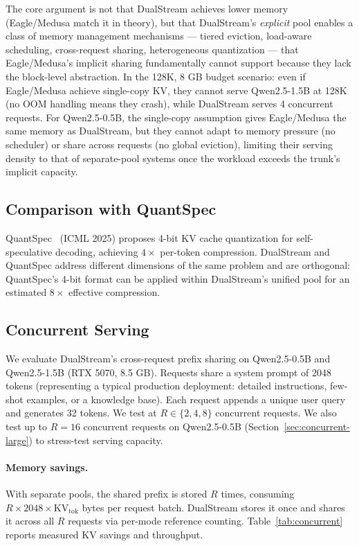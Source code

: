 \documentclass[review]{elsarticle}
\theoremstyle{definition}
\theoremstyle{remark}
\begin{document}
The core argument is not that DualStream achieves lower memory
(Eagle/Medusa match it in theory), but that DualStream's \emph{explicit}
pool enables a class of memory management mechanisms --- tiered eviction,
load-aware scheduling, cross-request sharing, heterogeneous
quantization --- that Eagle/Medusa's implicit sharing fundamentally
cannot support because they lack the block-level abstraction.
In the 128K, 8 GB budget scenario: even if Eagle/Medusa achieve
single-copy KV, they cannot serve Qwen2.5-1.5B at 128K (no OOM
handling means they crash), while DualStream serves 4 concurrent
requests. For Qwen2.5-0.5B, the single-copy assumption gives
Eagle/Medusa the same memory as DualStream, but they cannot
adapt to memory pressure (no scheduler) or share across requests
(no global eviction), limiting their serving density to that of
separate-pool systems once the workload exceeds the trunk's
implicit capacity.

\subsection{Comparison with QuantSpec}
\label{sec:eval-quantspec}

QuantSpec~\cite{quantspec2025} (ICML 2025) proposes 4-bit KV cache
quantization for self-speculative decoding, achieving $4\times$ per-token
compression. DualStream and QuantSpec address different dimensions of
the same problem and are orthogonal: QuantSpec's 4-bit format can be
applied within DualStream's unified pool for an estimated $8\times$
effective compression.

\subsection{Concurrent Serving}
\label{sec:concurrent-serving}

We evaluate DualStream's cross-request prefix sharing on Qwen2.5-0.5B
and Qwen2.5-1.5B (RTX 5070, 8.5 GB). Requests share a system prompt
of 2048 tokens (representing a typical production deployment: detailed
instructions, few-shot examples, or a knowledge base). Each request
appends a unique user query and generates 32 tokens. We test at
$R \in \{2, 4, 8\}$ concurrent requests. We also test up to $R=16$ concurrent
requests on Qwen2.5-0.5B (Section~\ref{sec:concurrent-large}) to stress-test
serving capacity.

\paragraph{Memory savings.}
With separate pools, the shared prefix is stored $R$ times, consuming
$R \times 2048 \times \text{KV}_\text{tok}$ bytes per request batch.
DualStream stores it once and shares it across all $R$ requests via
per-mode reference counting. Table~\ref{tab:concurrent} reports
measured KV savings and throughput.
\end{document}

